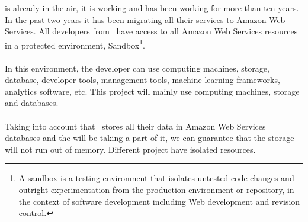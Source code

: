 \company is already in the air, it is working and has been working for more than ten years. In the past two years it has been migrating all their services to Amazon Web Services\cite{aws}. All developers from \company\ have access to all Amazon Web Services resources in a protected environment, Sandbox\footnote{A sandbox\cite{sandbox_wiki} is a testing environment that isolates untested code changes and outright experimentation from the production environment or repository, in the context of software development including Web development and revision control.}.
\\\\
In this environment, the developer can use computing machines, storage, database, developer tools, management tools, machine learning frameworks, analytics software, etc. This project will mainly use computing machines, storage and databases.
\\\\
Taking into account that \company\ stores all their data in Amazon Web Services databases and the \thesistitle will be taking a part of it, we can guarantee that the storage will not run out of memory. Different project have isolated resources.



